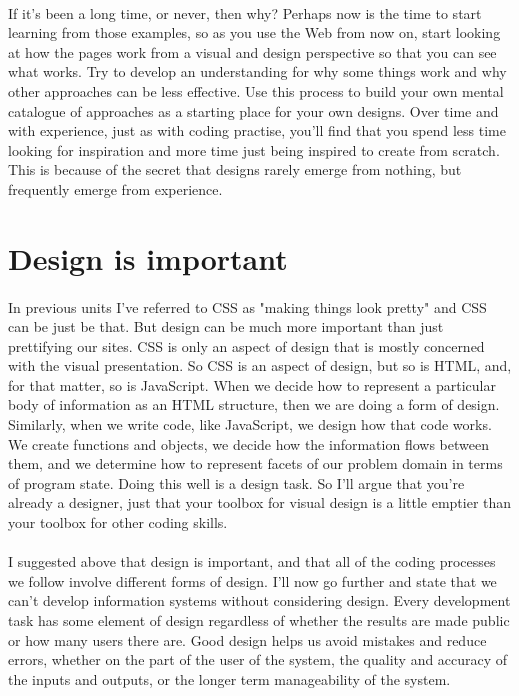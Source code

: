 \paragraph{} If it's been a long time, or never, then why? Perhaps now is the time to start learning from those examples, so as you use the Web from now on, start looking at how the pages work from a visual and design perspective so that you can see what works. Try to develop an understanding for why some things work and why other approaches can be less effective. Use this process to build your own mental catalogue of approaches as a starting place for your own designs. Over time and with experience, just as with coding practise, you'll find that you spend less time looking for inspiration and more time just being inspired to create from scratch. This is because of the secret that designs rarely emerge from nothing, but frequently emerge from experience.


\section{Design is important}
\paragraph{} In previous units I’ve referred to CSS as "making things look pretty" and CSS can be just be that. But design can be much more important than just prettifying our sites. CSS is only an aspect of design that is mostly concerned with the visual presentation. So CSS is an aspect of design, but so is HTML, and, for that matter, so is JavaScript. When we decide how to represent a particular body of information as an HTML structure, then we are doing a form of design. Similarly, when we write code, like JavaScript, we design how that code works. We create functions and objects, we decide how the information flows between them, and we determine how to represent facets of our problem domain in terms of program state. Doing this well is a design task. So I'll argue that you're already a designer, just that your toolbox for visual design is a little emptier than your toolbox for other coding skills.
\paragraph{} I suggested above that design is important, and that all of the coding processes we follow involve different forms of design. I'll now go further and state that we can’t develop information systems without considering design. Every development task has some element of design regardless of whether the results are made public or how many users there are. Good design helps us avoid mistakes and reduce errors, whether on the part of the user of the system, the quality and accuracy of the inputs and outputs, or the longer term manageability of the system.
